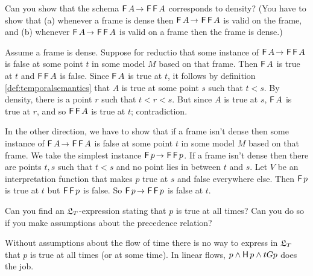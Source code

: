 \begin{exercise}
  Can you show that the schema $\tF A \to \tF\tF A$ corresponds to density? (You
  have to show that (a) whenever a frame is dense then $\tF A \to \tF\tF A$ is
  valid on the frame, and (b) whenever $\tF A \to \tF\tF A$ is valid on a frame
  then the frame is dense.)
\end{exercise}
\begin{solution}
  Assume a frame is dense. Suppose for reductio that some instance of
  $\tF A \to \tF\tF A$ is false at some point $t$ in some model $M$ based on
  that frame. Then $\operatorname{\mathsf{F}} A$ is true at $t$ and $\operatorname{\mathsf{F}}\operatorname{\mathsf{F}} A$ is false. Since $\operatorname{\mathsf{F}} A$
  is true at $t$, it follows by definition \ref{def:temporalsemantics} that $A$
  is true at some point $s$ such that $t<s$. By density, there is a point $r$
  such that $t<r<s$. But since $A$ is true at $s$, $\operatorname{\mathsf{F}} A$ is true at $r$, and
  so $\operatorname{\mathsf{F}}\operatorname{\mathsf{F}} A$ is true at $t$; contradiction.

  In the other direction, we have to show that if a frame isn't dense then some
  instance of $\tF A \to \tF\tF A$ is false at some point $t$ in some model $M$
  based on that frame. We take the simplest instance $\tF p \to \tF\tF p$. If a
  frame isn't dense then there are points $t,s$ such that $t<s$ and no point
  lies in between $t$ and $s$. Let $V$ be an interpretation function that makes
  $p$ true at $s$ and false everywhere else. Then $\operatorname{\mathsf{F}} p$ is true at $t$ but
  $\operatorname{\mathsf{F}}\operatorname{\mathsf{F}} p$ is false. So $\tF p \to \tF\tF p$ is false at $t$.
\end{solution}
\vspace{-2mm}

\begin{exercise}
  Can you find an $\mathfrak{L}_T$-expression stating that $p$ is true at all times? Can
  you do so if you make assumptions about the precedence relation?
\end{exercise}
\begin{solution}
  Without assumptions about the flow of time there is no way to express in
  $\mathfrak{L}_T$ that $p$ is true at all times (or at some time). In linear flows,
  $p \land \operatorname{\mathsf{H}} p \land tG p$ does the job. 
\end{solution}


